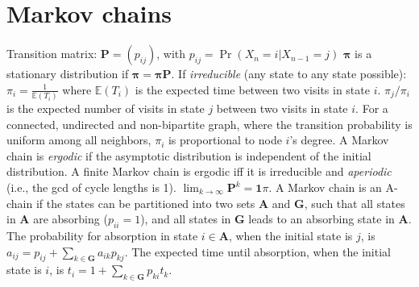 \section{Markov chains}
Transition matrix: $\mathbf{P} = (p_{ij})$, with $p_{ij} = \Pr(X_n = i | X_{n-1} = j)$
% 
$\mathbf{\pi}$ is a stationary distribution if $\mathbf{\pi} = \mathbf{\pi P}$.
If \emph{irreducible} (any state to any state possible): $\pi_i = \frac{1}{\mathbb{E}(T_i)}$ where $\mathbb{E}(T_i)$ is the expected time between two visits in state $i$.
$\pi_j/\pi_i$ is the expected number of visits in state $j$ between two visits in state $i$.
% 
For a connected, undirected and non-bipartite graph, where the transition probability is uniform among all neighbors, $\pi_i$ is proportional to node $i$'s degree.
% 
A Markov chain is \emph{ergodic} if the asymptotic distribution is independent of the initial distribution.
A finite Markov chain is ergodic iff it is irreducible and \emph{aperiodic} (i.e., the gcd of cycle lengths is 1).
$\lim_{k\rightarrow\infty}\mathbf{P}^k = \mathbf{1}\pi$.
% 
A Markov chain is an A-chain if the states can be partitioned into two sets $\mathbf{A}$ and $\mathbf{G}$, such that all states in $\mathbf{A}$ are absorbing ($p_{ii}=1$), and all states in $\mathbf{G}$ leads to an absorbing state in $\mathbf{A}$.
The probability for absorption in state $i\in\mathbf{A}$, when the initial state is $j$, is $a_{ij} = p_{ij}+\sum_{k\in\mathbf{G}} a_{ik}p_{kj}$.
The expected time until absorption, when the initial state is $i$, is $t_i = 1+\sum_{k\in\mathbf{G}}p_{ki}t_k$.

